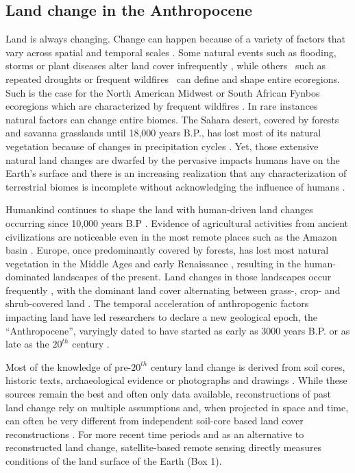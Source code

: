 \subsection{Land change in the Anthropocene}
\label{C01_0101}

Land is always changing. Change can happen because of a variety of factors that vary across spatial and temporal scales \citep{Lambin2003,Kennedy2014}. Some natural events such as flooding, storms or plant diseases alter land cover infrequently \citep{Turner1998}, while others \textendash\ such as repeated droughts or frequent wildfires \textendash\ can define and shape entire ecoregions. Such is the case for the North American Midwest or South African Fynbos ecoregions which are characterized by frequent wildfires \citep{Westerling2006,Kelly2017}. In rare instances natural factors can change entire biomes. The Sahara desert, covered by forests and savanna grasslands until 18,000 years B.P., has lost most of its natural vegetation because of changes in precipitation cycles \citep{Hamilton1981}. Yet, those extensive natural land changes are dwarfed by the pervasive impacts humans have on the Earth’s surface and there is an increasing realization that any characterization of terrestrial biomes is incomplete without acknowledging the influence of humans \citep{Ellis2008,Kehoe2017}.

Humankind continues to shape the land \citep{Ellis2011,Ellis2013} with human-driven land changes occurring since 10,000 years B.P \citep{Ellis2013}. Evidence of agricultural activities from ancient civilizations are noticeable even in the most remote places such as the Amazon basin \citep{McMichael2017}. Europe, once predominantly covered by forests, has lost most natural vegetation in the Middle Ages and early Renaissance \citep{Kaplan2009}, resulting in the human-dominated landscapes of the present. Land changes in those landscapes occur frequently \citep{Kleyer2007}, with the dominant land cover alternating between grass-, crop- and shrub-covered land \citep{Kleyer2007,Manning2009}. The temporal acceleration of anthropogenic factors impacting land \citep{Steffen2015} have led researchers to declare a new geological epoch, the “Anthropocene”, varyingly dated to have started as early as 3000 years B.P. or as late as the $20^{th}$ century \citep{Ellis2013a}. 

Most of the knowledge of pre-$20^{th}$ century land change is derived from soil cores, historic texts, archaeological evidence or photographs and drawings \citep{KleinGoldewijk2011,KleinGoldewijk2016}. While these sources remain the best and often only data available, reconstructions of past land change rely on multiple assumptions \citep{KleinGoldewijk2013} and, when projected in space and time, can often be very different from independent soil-core based land cover reconstructions \citep{Kaplan2017}. For more recent time periods and as an alternative to reconstructed land change, satellite-based remote sensing directly measures conditions of the land surface of the Earth (Box 1).

